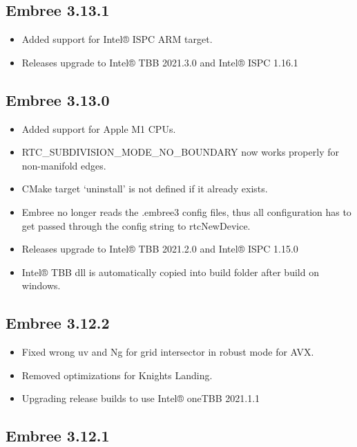 \subsection{Embree 3.13.1}\label{embree-3.13.1}

\begin{itemize}
\tightlist
\item
  Added support for Intel® ISPC ARM target.
\item
  Releases upgrade to Intel® TBB 2021.3.0 and Intel® ISPC 1.16.1
\end{itemize}

\subsection{Embree 3.13.0}\label{embree-3.13.0}

\begin{itemize}
\tightlist
\item
  Added support for Apple M1 CPUs.
\item
  RTC\_SUBDIVISION\_MODE\_NO\_BOUNDARY now works properly for
  non-manifold edges.
\item
  CMake target `uninstall' is not defined if it already exists.
\item
  Embree no longer reads the .embree3 config files, thus all
  configuration has to get passed through the config string to
  rtcNewDevice.
\item
  Releases upgrade to Intel® TBB 2021.2.0 and Intel® ISPC 1.15.0
\item
  Intel® TBB dll is automatically copied into build folder after build
  on windows.
\end{itemize}

\subsection{Embree 3.12.2}\label{embree-3.12.2}

\begin{itemize}
\tightlist
\item
  Fixed wrong uv and Ng for grid intersector in robust mode for AVX.
\item
  Removed optimizations for Knights Landing.
\item
  Upgrading release builds to use Intel® oneTBB 2021.1.1
\end{itemize}

\subsection{Embree 3.12.1}\label{embree-3.12.1}

